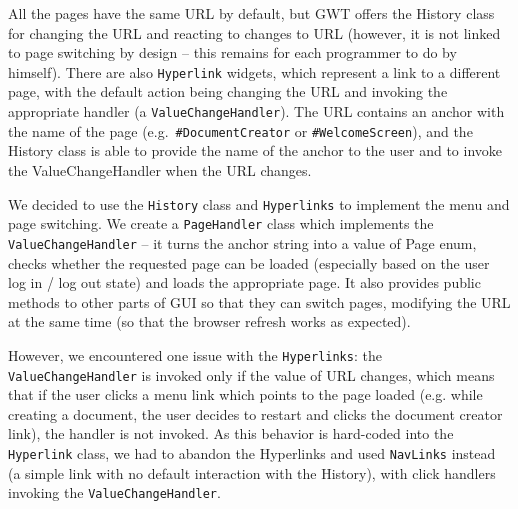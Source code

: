 {All the pages have the same URL by default, but GWT offers the History class for changing the URL and reacting to changes to URL (however, it is not linked to page switching by design -- this remains for each programmer to do by himself). There are also {\tt Hyperlink} widgets, which represent a link to a different page, with the default action being changing the URL and invoking the appropriate handler (a {\tt ValueChangeHandler}).
The URL contains an anchor with the name of the page (e.g.\ {\tt \#DocumentCreator} or {\tt \#WelcomeScreen}), and the History class is able to provide the name of the anchor to the user and to invoke the ValueChangeHandler when the URL changes.

We decided to use the {\tt History} class and {\tt Hyperlinks} to implement the menu and page switching. We create a {\tt PageHandler} class which implements the {\tt ValueChangeHandler} -- it turns the anchor string into a value of Page enum, checks whether the requested page can be loaded (especially based on the user log in / log out state) and loads the appropriate page. It also provides public methods to other parts of GUI so that they can switch pages, modifying the URL at the same time (so that the browser refresh works as expected).

However, we encountered one issue with the {\tt Hyperlinks}: the {\tt ValueChangeHandler} is invoked only if the value of URL changes, which means that if the user clicks a menu link which points to the page loaded (e.g. while creating a document, the user decides to restart and clicks the document creator link), the handler is not invoked. As this behavior is hard-coded into the {\tt Hyperlink} class, we had to abandon the Hyperlinks and used {\tt NavLinks} instead (a simple link with no default interaction with the History), with click handlers invoking the {\tt ValueChangeHandler}.



}
